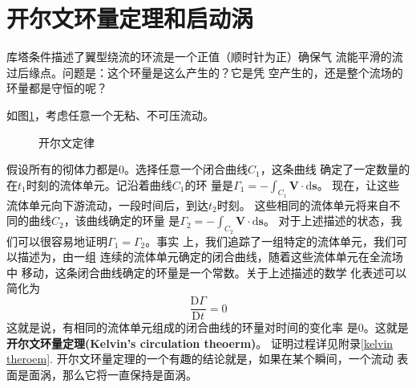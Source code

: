 \section{开尔文环量定理和启动涡}
库塔条件描述了翼型绕流的环流是一个正值（顺时针为正）确保气
流能平滑的流过后缘点。问题是：这个环量是这么产生的？它是凭
空产生的，还是整个流场的环量都是守恒的呢？

如图\ref{fig:circulation}，考虑任意一个无粘、不可压流动。
\begin{figure}[!ht]
  \centering
  
  \caption{开尔文定律}
  \label{fig:circulation}
\end{figure}
假设所有的彻体力都是0。选择任意一个闭合曲线$C_1$，这条曲线
确定了一定数量的在$t_1$时刻的流体单元。记沿着曲线$C_1$的环
量是$\Gamma_1=-\int _{C_1} \mathbf{V}\cdot \mathrm{d}\mathbf{s}$。
现在，让这些流体单元向下游流动，一段时间后，到达$t_2$时刻。
这些相同的流体单元将来自不同的曲线$C_2$，该曲线确定的环量
是$\Gamma_2=-\int _{C_2} \mathbf{V} \cdot \mathrm{d}\mathbf{s}$。
对于上述描述的状态，我们可以很容易地证明$\Gamma_1=\Gamma_2$。事实
上，我们追踪了一组特定的流体单元，我们可以描述为，由一组
连续的流体单元确定的闭合曲线，随着这些流体单元在全流场中
移动，这条闭合曲线确定的环量是一个常数。关于上述描述的数学
化表述可以简化为
\[
  \frac{\mathrm{D} \Gamma}{\mathrm{D} t}=0
\]
这就是说，有相同的流体单元组成的闭合曲线的环量对时间的变化率
是0。这就是{\bfseries 开尔文环量定理(Kelvin's circulation theoerm)}。
证明过程详见{\color{titleblue}附录\ref{kelvin theroem}}.
开尔文环量定理的一个有趣的结论就是，如果在某个瞬间，一个流动
表面是面涡，那么它将一直保持是面涡。

